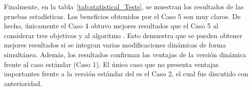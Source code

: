 Finalmente, en la tabla~\ref{tab:statistical_Tests}, se muestran los resultados de las pruebas estadísticas.
%
Los beneficios obtenidos por el Caso 5 son muy claros. 
%
De hecho, únicamente el Caso 4 obtuvo mejores resultados que el Caso 5 al considerar tres objetivos y al algoritmo \NSGAII{}.
%
Esto demuestra que se pueden obtener mejores resultados si se integran varias modificaciones dinámicas de forma simultánea.
%
Además, los resultados confirman las ventajas de la versión dinámica frente al caso estándar (Caso 1).
%
El único caso que no presenta ventajas importantes frente a la versión estándar del \SBX{} es el Caso 2, el cual fue discutido con anterioridad.
